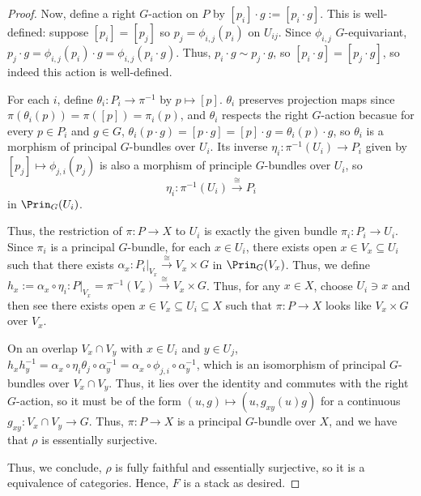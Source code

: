 \begin{proof}
    Now, define a right \( G \)-action on \( P \) by \( [p_i]\cdot g := [p_i \cdot g] \). This is well-defined: suppose \( [p_i] = [p_j] \) so \( p_j = \phi_{i,j}(p_i) \) on \( U_{ij} \). Since \( \phi_{i,j} \) \( G \)-equivariant, \( p_j \cdot g = \phi_{i,j}(p_i) \cdot g = \phi_{i,j}(p_i \cdot g) \). Thus, \( p_i \cdot g \sim p_j \cdot g \), so \( [p_i \cdot g] = [p_j \cdot g] \), so indeed this action is well-defined.
    
    For each \( i \), define \( \theta_i: P_i \to \pi^{-1} \) by \( p \mapsto [p] \). \( \theta_i \) preserves projection maps since \( \pi(\theta_i(p)) = \pi([p]) = \pi_i(p) \), and \( \theta_i \) respects the right \( G \)-action becasue for every \( p \in P_i \) and \( g \in G \), \( \theta_i(p\cdot g) = [p\cdot g] = [p] \cdot g = \theta_i(p)\cdot g \), so \( \theta_i \) is a morphism of principal \( G \)-bundles over \( U_i \). Its inverse \( \eta_i: \pi^{-1}(U_i) \to P_i \) given by \( [p_j] \mapsto \phi_{j,i}(p_j) \) is also a morphism of principle \( G \)-bundles over \( U_i \), so
    \[ \eta_i: \pi^{-1}(U_i) \xrightarrow{\cong} P_i \]
    in \( \Prin_G(U_i) \).
    
    Thus, the restriction of \( \pi:P \to X \) to \( U_i \) is exactly the given bundle \( \pi_i:P_i\to U_i \). Since \( \pi_i \) is a principal \( G \)-bundle, for each \( x\in U_i \), there exists open \( x \in V_x \subseteq U_i \) such that there exists \( \alpha_x: P_i|_{V_x} \xrightarrow{\cong} V_x \times G \) in \( \Prin_G(V_x) \). Thus, we define \( h_x:= \alpha_x \circ \eta_i: P|_{V_x} = \pi^{-1}(V_x) \xrightarrow{\cong} V_x \times G \). Thus, for any \( x \in X \), choose \( U_i \ni x \) and then see there exists open \( x\in V_x \subseteq U_i \subseteq X \) such that \( \pi: P \to X \) looks like \( V_x \times G \) over \( V_x \).
    
    On an overlap \( V_x \cap V_y \) with \( x \in U_i \) and \( y \in U_j \), \( h_x h_y^{-1} = \alpha_x \circ \eta_i\theta_j \circ \alpha_y^{-1} = \alpha_x \circ \phi_{j,i} \circ \alpha_y^{-1} \), which is an isomorphism of principal \( G \)-bundles over \( V_x \cap V_y \). Thus, it lies over the identity and commutes with the right \( G \)-action, so it must be of the form \( (u,g) \mapsto (u,g_{xy}(u)g) \) for a continuous \( g_{xy}: V_x \cap V_y \to G \). Thus, \( \pi: P \to X \) is a principal \( G \)-bundle over \( X \), and we have that \( \rho \) is essentially surjective.
    
    Thus, we conclude, \( \rho \) is fully faithful and essentially surjective, so it is a equivalence of categories. Hence, \( F \) is a stack as desired.
\end{proof}
